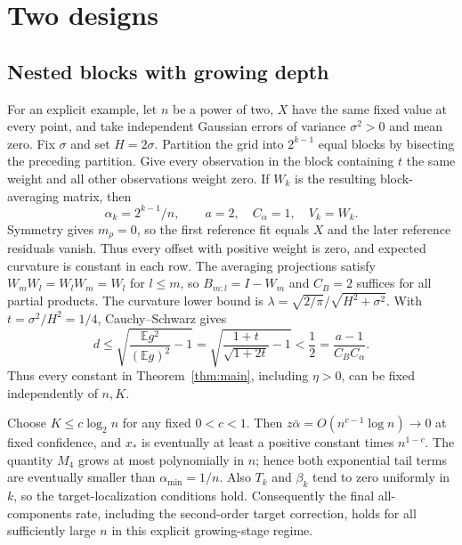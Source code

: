 \documentclass[11pt]{article}
\newcommand{\E}{\mathbb E}
\theoremstyle{remark}
\begin{document}
\clearpage
\section{Two designs}
\subsection{Nested blocks with growing depth}
For an explicit example, let \(n\) be a power of two, \(X\) have the same fixed value at every point,
and take independent Gaussian errors of variance \(\sigma^2>0\) and mean zero.
Fix \(\sigma\) and set \(H=2\sigma\).
Partition the grid into \(2^{k-1}\) equal blocks by bisecting the
preceding partition. Give every observation in the block containing \(t\)
the same weight and all other observations weight zero. If \(W_k\)
is the resulting block-averaging matrix, then
\[
 \alpha_k=2^{k-1}/n,\qquad a=2,\quad C_\alpha=1,\quad V_k=W_k.
\]
Symmetry gives \(m_\rho=0\), so the first reference fit equals \(X\)
and the later reference residuals vanish. Thus every offset with positive
weight is zero, and expected curvature is constant in each row.
The averaging projections satisfy \(W_mW_l=W_lW_m=W_l\) for \(l\le m\),
so \(B_{m:l}=I-W_m\) and \(C_B=2\) suffices for all partial products.
The curvature lower bound is
\(\lambda=\sqrt{2/\pi}/\sqrt{H^2+\sigma^2}\).
With \(t=\sigma^2/H^2=1/4\), Cauchy--Schwarz gives
\[
 d\le\sqrt{\frac{\E g^2}{(\E g)^2}-1}
   =\sqrt{\frac{1+t}{\sqrt{1+2t}}-1}<\frac12
   =\frac{a-1}{C_BC_\alpha}.
\]
Thus every constant in Theorem~\ref{thm:main}, including \(\eta>0\),
can be fixed independently of \(n,K\).

Choose \(K\le c\log_2 n\) for any fixed \(0<c<1\).
Then \(z\bar\alpha=O(n^{c-1}\log n)\to0\) at fixed confidence,
and \(x_*\) is eventually at least a positive constant times \(n^{1-c}\).
The quantity \(M_4\) grows at most polynomially in \(n\); hence both
exponential tail terms are eventually smaller than
\(\alpha_{\min}=1/n\). Also \(T_k\) and \(\beta_k\) tend to zero
uniformly in \(k\), so the target-localization conditions hold.
Consequently the final all-components rate, including the second-order
target correction, holds for all sufficiently large \(n\) in this
explicit growing-stage regime.
\end{document}
